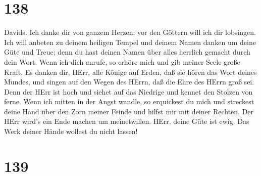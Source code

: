 \hypertarget{section-137}{%
\section{138}\label{section-137}}

 Davids. Ich danke dir von ganzem Herzen; vor den Göttern
will ich dir lobsingen.  Ich will anbeten zu deinem heiligen
Tempel und deinem Namen danken um deine Güte und Treue; denn du hast
deinen Namen über alles herrlich gemacht durch dein Wort. 
Wenn ich dich anrufe, so erhöre mich und gib meiner Seele große Kraft.
 Es danken dir, HErr, alle Könige auf Erden, daß sie hören
das Wort deines Mundes,  und singen auf den Wegen des HErrn,
daß die Ehre des HErrn groß sei.  Denn der HErr ist hoch und
siehet auf das Niedrige und kennet den Stolzen von ferne. 
Wenn ich mitten in der Angst wandle, so erquickest du mich und streckest
deine Hand über den Zorn meiner Feinde und hilfst mir mit deiner
Rechten.  Der HErr wird's ein Ende machen um meinetwillen.
HErr, deine Güte ist ewig. Das Werk deiner Hände wollest du nicht
lassen!

\hypertarget{section-138}{%
\section{139}\label{section-138}}

